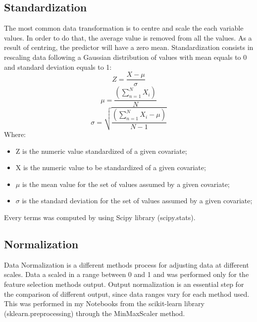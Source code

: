 \subsection{Standardization}
The most common data transformation is to centre and scale the each variable values. In order to do that, the average value is removed from all the values. As a result of centring, the predictor will have a zero mean.\cite{kuhn2013applied}
Standardization consists in rescaling data following a Gaussian distribution of values with mean equals to 0 and standard deviation equals to 1:
\begin{equation}
  Z = \frac{X-\mu}{\sigma}
\end{equation}
\begin{equation}
\mu = \frac{(\sum_{n=1}^{N} X_i)}{N}
\end{equation}
\begin{equation}
\sigma = \sqrt{\frac{(\sum_{n=1}^{N} X_i-\mu)}{N-1}}
\end{equation}
Where:
\begin{itemize}
\item Z is the numeric value standardized of a given covariate;
\item X is the numeric value to be standardized of a given covariate;
\item $\mu$ is the mean value for the set of values assumed by a given covariate;
\item $\sigma$ is the standard deviation for the set of values assumed by a given covariate;
\end{itemize}
Every terms was computed by using Scipy library (scipy.stats). 
\bigbreak
\subsection{Normalization}
Data Normalization is a different methods process for adjusting data at different scales. Data a scaled in a range between 0 and 1 and was performed only for the feature selection methods output.
Output normalization is an essential step for the comparison of different output, since data ranges vary for each method used.\newline
This was performed in my Notebooks from the scikit-learn library (sklearn.preprocessing) through the MinMaxScaler method.

